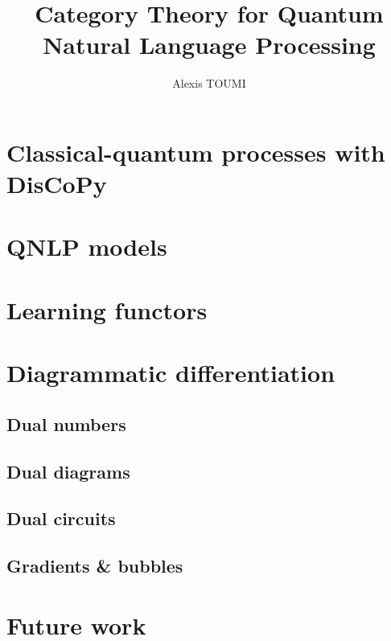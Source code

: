 \documentclass[a4paper,twoside]{ociamthesis}
\title{Category Theory for Quantum\\Natural Language Processing}
\author{Alexis TOUMI} \college{Wolfson College} \degree{Doctor of Philosophy}
\begin{document}
% 
%
% 
% 
% 
% 
% 
%
% 
% 
% 
% 
% 
% 
% 
% 
% 
% 
% 
% 
%
% 
% 
% 
% 
% 


\section{Classical-quantum processes with DisCoPy}
\section{QNLP models}
\section{Learning functors}

\section{Diagrammatic differentiation} \label{chapter-3:diag-diff}
\subsection{Dual numbers}
\subsection{Dual diagrams}
\subsection{Dual circuits}
\subsection{Gradients \& bubbles}

\section{Future work}

\renewcommand*\MakeUppercase[1]{#1}%
\setlength{\baselineskip}{0pt} %
\printbibliography[heading=bibintoc,title=References]
\end{document}
